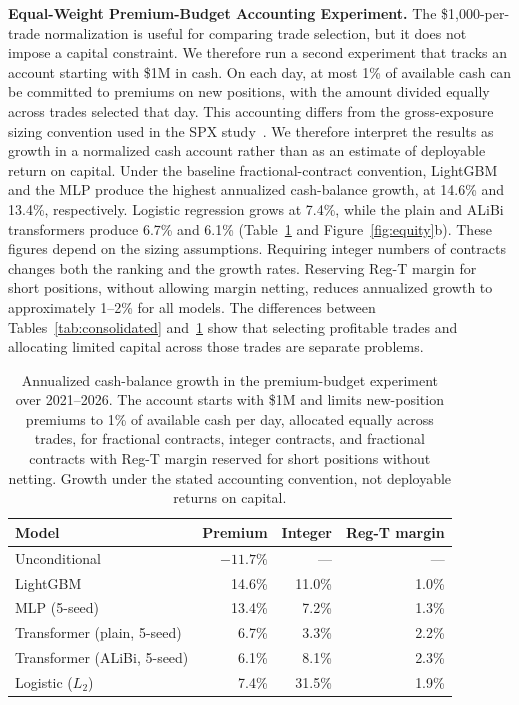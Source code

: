 \documentclass[sigconf,review,anonymous]{acmart}
\begin{document}

\smallskip\noindent\textbf{Equal-Weight Premium-Budget Accounting Experiment.}
\label{sec:capitalscaled}
The \$1{,}000-per-trade normalization is useful for comparing trade selection, but it does not impose a capital constraint. We therefore run a second experiment that tracks an account starting with \$1M in cash. On each day, at most 1\% of available cash can be committed to premiums on new positions, with the amount divided equally across trades selected that day.
This accounting differs from the gross-exposure sizing convention used in the SPX study~\cite{glasserman2025tp2}. We therefore interpret the results as growth in a normalized cash account rather than as an estimate of deployable return on capital.
Under the baseline fractional-contract convention, LightGBM and the MLP produce the highest annualized cash-balance growth, at 14.6\% and 13.4\%, respectively. Logistic regression grows at 7.4\%, while the plain and ALiBi transformers produce 6.7\% and 6.1\% (Table~\ref{tab:capitalscaled} and Figure~\ref{fig:equity}b).
These figures depend on the sizing assumptions. Requiring integer numbers of contracts changes both the ranking and the growth rates. Reserving Reg-T margin for short positions, without allowing margin netting, reduces annualized growth to approximately 1--2\% for all models. The differences between Tables~\ref{tab:consolidated} and~\ref{tab:capitalscaled} show that selecting profitable trades and allocating limited capital across those trades are separate problems.

\begin{table}[tb]
\centering
\footnotesize
\begin{tabular}{lrrr}
\toprule
Model & Premium & Integer & Reg-T margin \\
\midrule
Unconditional & $-11.7\%$ & --- & --- \\
LightGBM & 14.6\% & 11.0\% & 1.0\% \\
MLP (5-seed) & 13.4\% & 7.2\% & 1.3\% \\
Transformer (plain, 5-seed) & 6.7\% & 3.3\% & 2.2\% \\
Transformer (ALiBi, 5-seed) & 6.1\% & 8.1\% & 2.3\% \\
Logistic ($L_2$) & 7.4\% & 31.5\% & 1.9\% \\
\bottomrule
\end{tabular}
\caption{Annualized cash-balance growth in the premium-budget experiment over 2021--2026. The account starts with \$1M and limits new-position premiums to 1\% of available cash per day, allocated equally across trades, for fractional contracts, integer contracts, and fractional contracts with Reg-T margin reserved for short positions without netting. Growth under the stated accounting convention, not deployable returns on capital.}
\label{tab:capitalscaled}
\end{table}
\end{document}
